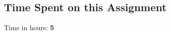 \documentclass[11pt]{scrartcl}
\begin{document}
\subsection*{Time Spent on this Assignment}

Time in hours: {\bf 5}


\end{document}
